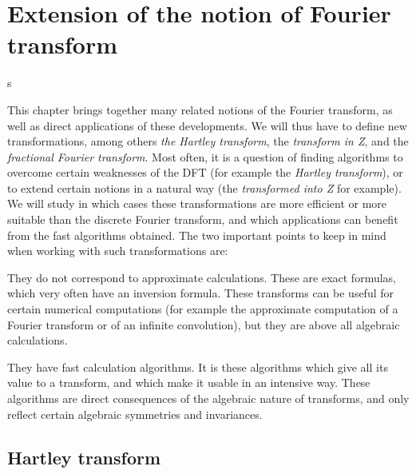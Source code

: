  
\chapter{Extension of the notion of Fourier transform}
\label{chap-extension-trans-fourier} 
 s
 
This chapter brings together many related notions of the Fourier transform, as well as direct applications of these developments. We will thus have to define new transformations, among others \textit{the Hartley transform}, the \textit{transform in Z}, and the \textit{fractional Fourier transform}. Most often, it is a question of finding algorithms to overcome certain weaknesses of the DFT (for example the \textit{Hartley transform}), or to extend certain notions in a natural way (the \textit{transformed into Z } for example). We will study in which cases these transformations are more efficient or more suitable than the discrete Fourier transform, and which applications can benefit from the fast algorithms obtained. The two important points to keep in mind when working with such transformations are: \begin{rs}
\item They do not correspond to approximate calculations. These are exact formulas, which very often have an inversion formula. These transforms can be useful for certain numerical computations (for example the approximate computation of a Fourier transform or of an infinite convolution), but they are above all algebraic calculations.
\item They have fast calculation algorithms. It is these algorithms which give all its value to a transform, and which make it usable in an intensive way. These algorithms are direct consequences of the algebraic nature of transforms, and only reflect certain algebraic symmetries and invariances.
\end{rs}
 
\section{Hartley transform}
\label{sect1-trans-hartley} 
 

